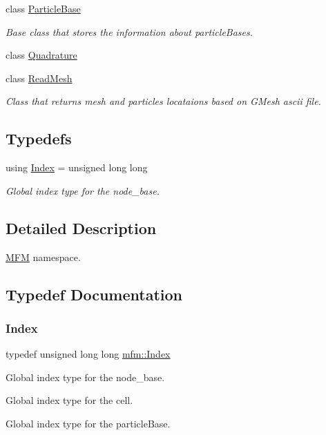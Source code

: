 \begin{DoxyCompactItemize}
class \hyperlink{classmfm_1_1_particle_base}{Particle\+Base}
\begin{DoxyCompactList}\small\item\em Base class that stores the information about particle\+Bases. \end{DoxyCompactList}\item 
class \hyperlink{classmfm_1_1_quadrature}{Quadrature}
\item 
class \hyperlink{classmfm_1_1_read_mesh}{Read\+Mesh}
\begin{DoxyCompactList}\small\item\em Class that returns mesh and particles locataions based on G\+Mesh ascii file. \end{DoxyCompactList}\end{DoxyCompactItemize}
\subsection*{Typedefs}
\begin{DoxyCompactItemize}
\item 
using \hyperlink{namespacemfm_a7d021c8caa1852f673d78358edc6b7f9}{Index} = unsigned long long
\begin{DoxyCompactList}\small\item\em Global index type for the node\+\_\+base. \end{DoxyCompactList}\end{DoxyCompactItemize}


\subsection{Detailed Description}
\hyperlink{classmfm_1_1_m_f_m}{M\+FM} namespace. 

\subsection{Typedef Documentation}
\mbox{\label{namespacemfm_a7d021c8caa1852f673d78358edc6b7f9}} 
\subsubsection{\texorpdfstring{Index}{Index}}
{\footnotesize\ttfamily typedef unsigned long long \hyperlink{namespacemfm_a7d021c8caa1852f673d78358edc6b7f9}{mfm\+::\+Index}}



Global index type for the node\+\_\+base. 

Global index type for the cell.

Global index type for the particle\+Base. 